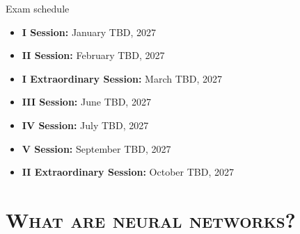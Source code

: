 \documentclass[xcolor=x11names,compress,10pt,unknownkeysallowed,aspectratio=169]{beamer}
\begin{document}
\begin{frame}{Exam schedule}
\begin{itemize}\justifying
	\item \alert{\textbf{I Session:}} January TBD, 2027
	
	\vspace{0.3cm}
	\item \alert{\textbf{II Session:}} February TBD, 2027
	
	\vspace{0.3cm}
	\item \alert{\textbf{I Extraordinary Session:}} March TBD, 2027

        \vspace{0.3cm}
	\item \alert{\textbf{III Session:}} June TBD, 2027
		
	\vspace{0.3cm}
	\item \alert{\textbf{IV Session:}} July TBD, 2027
	
	\vspace{0.3cm}
	\item \alert{\textbf{V Session:}} September TBD, 2027
	
	\vspace{0.3cm}
	\item \alert{\textbf{II Extraordinary Session:}} October TBD, 2027
\end{itemize}
\end{frame}
%
\section[\scshape\bfseries Sec 2]{\scshape\bfseries What are neural networks?}
%
\end{document}
